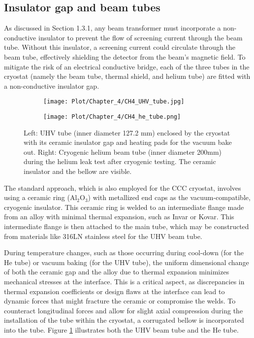 \documentclass[12pt,a4paper]{report}
\begin{document}
       	\subsection{Insulator gap and beam tubes}
		As discussed in Section 1.3.1, any beam transformer must incorporate a non-conductive insulator to prevent the flow of screening current through the beam tube. Without this insulator, a screening current could circulate through the beam tube, effectively shielding the detector from the beam's magnetic field. To mitigate the risk of an electrical conductive bridge, each of the three tubes in the cryostat (namely the beam tube, thermal shield, and helium tube) are fitted with a non-conductive insulator gap.
		\begin{figure}[H]
			\begin{subfigure}[b]{0.65\textwidth}
				\centering
				\texttt{[image: Plot/Chapter\_4/CH4\_UHV\_tube.jpg]}
			\end{subfigure}
			\hfill
			\begin{subfigure}[b]{0.3\textwidth}
				\centering
				\texttt{[image: Plot/Chapter\_4/CH4\_he\_tube.png]}
			\end{subfigure}
			\caption{\small{Left: UHV tube (inner diameter 127.2 mm) enclosed by the cryostat with its ceramic insulator gap and heating pads for the vacuum bake out. Right: Cryogenic helium beam tube (inner diameter 200mm) during the helium leak test after cryogenic testing. The ceramic insulator and the bellow are visible.}}
			\label{CH4_tubes}
		\end{figure}
		The standard approach, which is also employed for the CCC cryostat, involves using a ceramic ring (Al$_2$O$_3$) with metallized end caps as the vacuum-compatible, cryogenic insulator. This ceramic ring is welded to an intermediate flange made from an alloy with minimal thermal expansion, such as Invar or Kovar. This intermediate flange is then attached to the main tube, which may be constructed from materials like 316LN stainless steel for the UHV beam tube. 
		
		During temperature changes, such as those occurring during cool-down (for the He tube) or vacuum baking (for the UHV tube), the uniform dimensional change of both the ceramic gap and the alloy due to thermal expansion minimizes mechanical stresses at the interface. This is a critical aspect, as discrepancies in thermal expansion coefficients or design flaws at the interface can lead to dynamic forces that might fracture the ceramic or compromise the welds. To counteract longitudinal forces and allow for slight axial compression during the installation of the tube within the cryostat, a corrugated bellow is incorporated into the tube. Figure \ref{CH4_tubes} illustrates both the UHV beam tube and the He tube.\\
		
\end{document}
